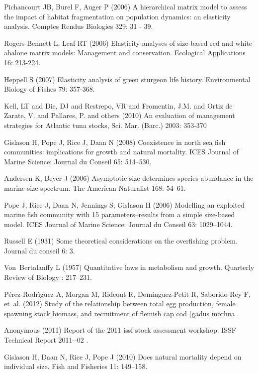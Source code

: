 \documentclass{pnastwo}
\begin{document}
\begin{article}
\begin{thebibliography}{10}
Pichancourt JB, Burel F, Auger P (2006) A hierarchical matrix model to assess
  the impact of habitat fragmentation on population dynamics: an elasticity
  analysis.
Comptes Rendus Biologies 329: 31 - 39.

Rogers-Bennett L, Leaf RT (2006) Elasticity analyses of size-based red and
  white abalone matrix models: Management and conservation.
Ecological Applications 16: 213-224.

Heppell S (2007) Elasticity analysis of green sturgeon life history.
Environmental Biology of Fishes 79: 357-368.

Kell, LT and Die, DJ and Restrepo, VR and Fromentin, J.M. and Ortiz de Zarate, V. and Pallares, P. and others (2010)
  An evaluation of management strategies for Atlantic tuna stocks,
Sci. Mar. (Barc.) 2003: 353-370

Gislason H, Pope J, Rice J, Daan N (2008) Coexistence in north sea fish
  communities: implications for growth and natural mortality.
ICES Journal of Marine Science: Journal du Conseil 65: 514--530.

Andersen K, Beyer J (2006) Asymptotic size determines species abundance in the
  marine size spectrum.
The American Naturalist 168: 54--61.

Pope J, Rice J, Daan N, Jennings S, Gislason H (2006) Modelling an exploited
  marine fish community with 15 parameters--results from a simple size-based
  model.
ICES Journal of Marine Science: Journal du Conseil 63: 1029--1044.

Russell E (1931) Some theoretical considerations on the overfishing problem.
Journal du conseil 6: 3.

Von~Bertalanffy L (1957) Quantitative laws in metabolism and growth.
Quarterly Review of Biology : 217--231.

P{\'e}rez-Rodr{\'\i}guez A, Morgan M, Rideout R, Dominguez-Petit R,
  Saborido-Rey F, et~al. (2012) Study of the relationship between total egg
  production, female spawning stock biomass, and recruitment of flemish cap cod
  (gadus morhua .

Anonymous (2011) Report of the 2011 issf stock assessment workshop.
ISSF Technical Report 2011-­‐02 .

Gislason H, Daan N, Rice J, Pope J (2010) Does natural mortality depend on
  individual size.
Fish and Fisheries 11: 149--158.


\end{thebibliography}
\end{article}
\end{document}
